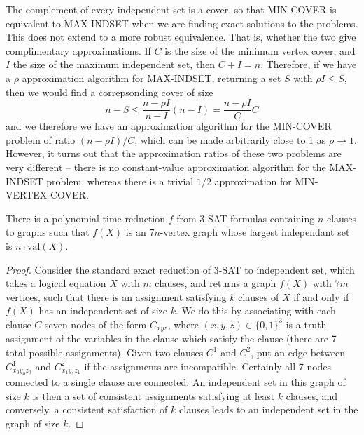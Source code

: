 The complement of every independent set is a cover, so that MIN-COVER is equivalent to MAX-INDSET when we are finding exact solutions to the problems. This does not extend to a more robust equivalence. That is, whether the two give complimentary approximations. If $C$ is the size of the minimum vertex cover, and $I$ the size of the maximum independent set, then $C + I = n$. Therefore, if we have a $\rho$ approximation algorithm for MAX-INDSET, returning a set $S$ with $\rho I \leq S$, then we would find a correpsonding cover of size
%
\[ n - S \leq \frac{n - \rho I}{n - I} (n - I) = \frac{n - \rho I}{C} C \]
%
and we therefore we have an approximation algorithm for the MIN-COVER problem of ratio $(n - \rho I)/C$, which can be made arbitrarily close to 1 as $\rho \to 1$. However, it turns out that the approximation ratios of these two problems are very different -- there is no constant-value approximation algorithm for the MAX-INDSET problem, whereas there is a trivial $1/2$ approximation for MIN-VERTEX-COVER.

\begin{lemma}
    There is a polynomial time reduction $f$ from 3-SAT formulas containing $n$ clauses to graphs such that $f(X)$ is an $7n$-vertex graph whose largest independant set is $n \cdot \text{val}(X)$.
\end{lemma}
\begin{proof}
    Consider the standard exact reduction of 3-SAT to independent set, which takes a logical equation $X$ with $m$ clauses, and returns a graph $f(X)$ with $7m$ vertices, such that there is an assignment satisfying $k$ clauses of $X$ if and only if $f(X)$ has an independent set of size $k$. We do this by associating with each clause $C$ seven nodes of the form $C_{xyz}$, where $(x,y,z) \in \{ 0, 1 \}^3$ is a truth assignment of the variables in the clause which satisfy the clause (there are 7 total possible assignments). Given two clauses $C^1$ and $C^2$, put an edge between $C^1_{x_0y_0z_0}$ and $C^2_{x_1y_1z_1}$ if the assignments are incompatible. Certainly all 7 nodes connected to a single clause are connected. An independent set in this graph of size $k$ is then a set of consistent assignments satisfying at least $k$ clauses, and conversely, a consistent satisfaction of $k$ clauses leads to an independent set in the graph of size $k$.
\end{proof}


